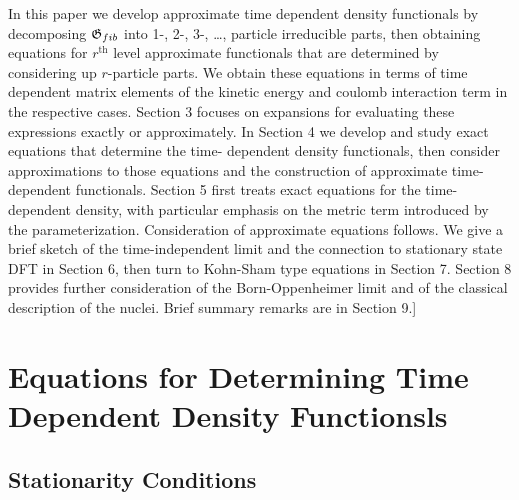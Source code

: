 In this paper we develop approximate time dependent density functionals by
decomposing ${\frak G}_{fib}$ into 1-, 2-, 3-, \ldots , particle irreducible
parts, then obtaining equations for $r^{\text{th}}$ level approximate
functionals that are determined by considering up $r$-particle parts. We
obtain these equations in terms of time dependent matrix elements of the
kinetic energy and coulomb interaction term in the respective cases. Section
3 focuses on expansions for evaluating these expressions exactly or
approximately. In Section 4 we develop and study exact equations that
determine the time- dependent density functionals, then consider
approximations to those equations and the construction of approximate
time-dependent functionals. Section 5 first treats exact equations for the
time-dependent density, with particular emphasis on the metric term
introduced by the parameterization. Consideration of approximate equations
follows. We give a brief sketch of the time-independent limit and the
connection to stationary state DFT in Section 6, then turn to Kohn-Sham type
equations in Section 7. Section 8 provides further consideration of the
Born-Oppenheimer limit and of the classical description of the nuclei. Brief
summary remarks are in Section 9.]

\section{Equations for Determining Time Dependent Density Functionsls}

\subsection{Stationarity Conditions\protect\bigskip}

